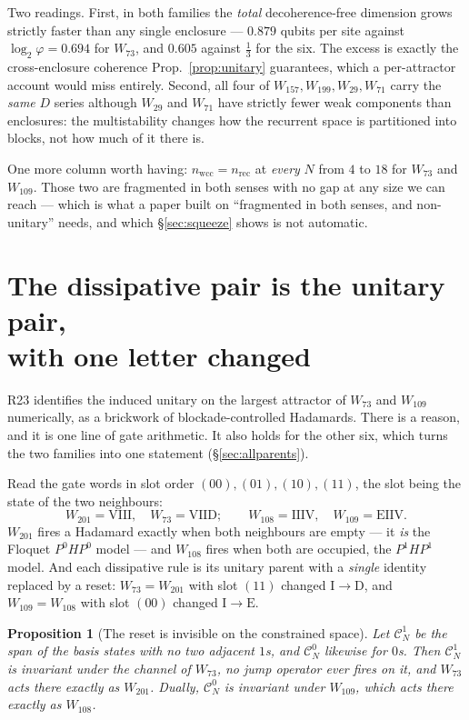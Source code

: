 \documentclass[11pt]{article}
\theoremstyle{plain}
\newtheorem{proposition}{Proposition}
\theoremstyle{remark}
\begin{document}
Two readings. First, in both families the \emph{total} decoherence-free
dimension grows strictly faster than any single enclosure --- $0.879$ qubits per
site against $\log_2\varphi = 0.694$ for $W_{73}$, and $0.605$ against
$\tfrac13$ for the six. The excess is exactly the cross-enclosure coherence
Prop.~\ref{prop:unitary} guarantees, which a per-attractor account would miss
entirely. Second, all four of $W_{157}, W_{199}, W_{29}, W_{71}$ carry the
\emph{same} $D$ series although $W_{29}$ and $W_{71}$ have strictly fewer weak
components than enclosures: the multistability changes how the recurrent space
is partitioned into blocks, not how much of it there is.

One more column worth having: $n_{\mathrm{wcc}} = n_{\mathrm{rec}}$ at
\emph{every} $N$ from $4$ to $18$ for $W_{73}$ and $W_{109}$. Those two are
fragmented in both senses with no gap at any size we can reach --- which is what
a paper built on ``fragmented in both senses, and non-unitary'' needs, and which
\S\ref{sec:squeeze} shows is not automatic.

\section{\texorpdfstring{The dissipative pair is the unitary pair,\\ with one
letter changed}{The dissipative pair is the unitary pair, with one letter
changed}}
\label{sec:parents}

R23 identifies the induced unitary on the largest attractor of $W_{73}$ and
$W_{109}$ numerically, as a brickwork of blockade-controlled Hadamards. There is
a reason, and it is one line of gate arithmetic. It also holds for the other
six, which turns the two families into one statement (\S\ref{sec:allparents}).

Read the gate words in slot order $(00),(01),(10),(11)$, the slot being the
state of the two neighbours:
\[
  W_{201} = \mathrm{VIII}, \quad W_{73} = \mathrm{VIID};
  \qquad
  W_{108} = \mathrm{IIIV}, \quad W_{109} = \mathrm{EIIV}.
\]
$W_{201}$ fires a Hadamard exactly when both neighbours are empty --- it
\emph{is} the Floquet $P^0HP^0$ model --- and $W_{108}$ fires when both are
occupied, the $P^1HP^1$ model. And each dissipative rule is its unitary parent
with a \emph{single} identity replaced by a reset: $W_{73} = W_{201}$ with
slot $(11)$ changed $\mathrm{I}\to\mathrm{D}$, and $W_{109} = W_{108}$ with slot
$(00)$ changed $\mathrm{I}\to\mathrm{E}$.

\begin{proposition}[The reset is invisible on the constrained space]
\label{prop:parents}
Let $\mathcal{C}^1_N$ be the span of the basis states with no two adjacent
$1$s, and $\mathcal{C}^0_N$ likewise for $0$s. Then $\mathcal{C}^1_N$ is invariant
under the channel of $W_{73}$, no jump operator ever fires on it, and $W_{73}$
acts there exactly as $W_{201}$. Dually, $\mathcal{C}^0_N$ is invariant under
$W_{109}$, which acts there exactly as $W_{108}$.
\end{proposition}
\end{document}
